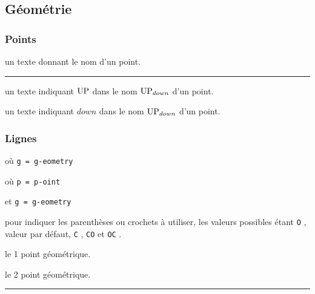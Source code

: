 \documentclass[12pt,a4paper]{article}
\theoremstyle{definition}
\newcommand\separation{
	\medskip
	\hfill\rule{0.5\textwidth}{0.75pt}\hfill
	\medskip
}
\newcommand\mwhyprefix[2]{%
	\texttt{#1 = #1-#2}%
}
\newcommand\prefix[1]{%
	\texttt{#1}%
}
\begin{document}
\vspace{-.75em}
\begin{multicols}{2}
    
    
    
    
    
    
    
\end{multicols}
\subsection{Géométrie}

\subsubsection{Points}


\IDarg{} un texte donnant le nom d'un point.


\separation



 un texte indiquant $\pt{UP}$ dans le nom $\pt*{UP}{down}$ d'un point.

 un texte indiquant $down$ dans le nom $\pt*{UP}{down}$ d'un point.





\subsubsection{Lignes}

   où \quad \mwhyprefix{g}{eometry}

  où \quad \mwhyprefix{p}{oint}
                              et \mwhyprefix{g}{eometry}

\IDoption{} pour indiquer les parenthèses ou crochets à utiliser, les valeurs possibles étant \prefix{O}, valeur par défaut, \prefix{C}, \prefix{CO} et \prefix{OC}.

 le 1\ier{} point géométrique.

 le 2\ieme{} point géométrique.


\separation
\end{document}
